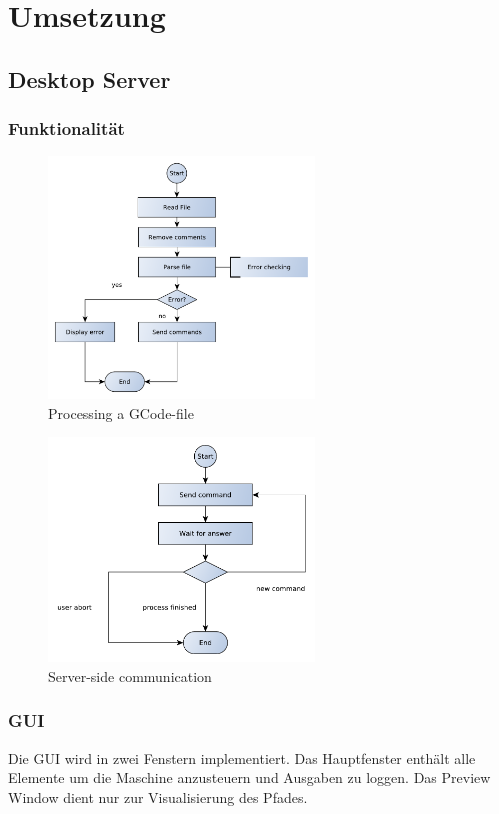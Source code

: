 \documentclass[11pt,a4paper,bibtotoc,oneside]{scrbook}
\begin{document}
\chapter{Umsetzung}

\section{Desktop Server}
\subsection{Funktionalität}
    \begin{figure}[H]
    \centering
        \includegraphics[width=200pt]{./picture/process1.pdf}
        \caption{\label{main}{Processing a GCode-file}}
    \end{figure}
    
        \begin{figure}[H]
    \centering
        \includegraphics[width=200pt]{./picture/process2.pdf}
        \caption{\label{main}{Server-side communication}}
    \end{figure}

\subsection{GUI}
Die GUI wird in zwei Fenstern implementiert. Das Hauptfenster enthält alle Elemente um die Maschine anzusteuern und Ausgaben zu loggen.
Das Preview Window dient nur zur Visualisierung des Pfades.
\end{document}

